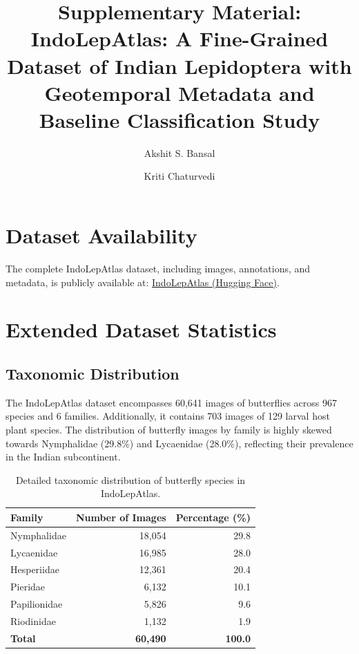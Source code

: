 \documentclass[runningheads]{llncs}
\begin{document}
\title{Supplementary Material: IndoLepAtlas: A Fine-Grained Dataset of Indian Lepidoptera with Geotemporal Metadata and Baseline Classification Study}
\author{Akshit S. Bansal \and Kriti Chaturvedi}
\maketitle

\setcounter{section}{0}
\renewcommand{\thesection}{S\arabic{section}}
\renewcommand{\thetable}{S\arabic{table}}
\renewcommand{\thefigure}{S\arabic{figure}}

\section{Dataset Availability}
The complete IndoLepAtlas dataset, including images, annotations, and metadata, is publicly available at: \href{https://huggingface.co/datasets/Butterfree/IndoLepAtlas}{IndoLepAtlas (Hugging Face)}.

\section{Extended Dataset Statistics}
\subsection{Taxonomic Distribution}
The IndoLepAtlas dataset encompasses 60,641 images of butterflies across 967 species and 6 families. Additionally, it contains 703 images of 129 larval host plant species. The distribution of butterfly images by family is highly skewed towards Nymphalidae (29.8\%) and Lycaenidae (28.0\%), reflecting their prevalence in the Indian subcontinent.

\begin{table}[H]
\centering
\caption{Detailed taxonomic distribution of butterfly species in IndoLepAtlas.}
\label{tab:s_family_dist}
\begin{tabular}{lrr}
\toprule
\textbf{Family} & \textbf{Number of Images} & \textbf{Percentage (\%)} \\
\midrule
Nymphalidae & 18,054 & 29.8 \\
Lycaenidae & 16,985 & 28.0 \\
Hesperiidae & 12,361 & 20.4 \\
Pieridae & 6,132 & 10.1 \\
Papilionidae & 5,826 & 9.6 \\
Riodinidae & 1,132 & 1.9 \\
\midrule
\textbf{Total} & \textbf{60,490} & \textbf{100.0} \\
\bottomrule
\end{tabular}
\end{table}
\end{document}
